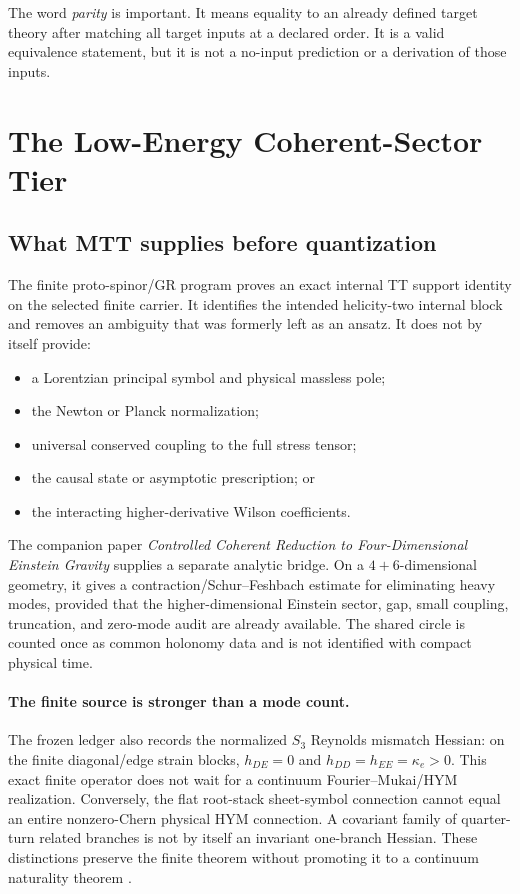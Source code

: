 \documentclass[11pt]{article}
\begin{document}
The word \emph{parity} is important. It means equality to an already defined
target theory after matching all target inputs at a declared order. It is a
valid equivalence statement, but it is not a no-input prediction or a
derivation of those inputs.

\section{The Low-Energy Coherent-Sector Tier}

\subsection{What MTT supplies before quantization}

The finite proto-spinor/GR program proves an exact internal TT support
identity on the selected finite carrier. It identifies the intended
helicity-two internal block and removes an ambiguity that was formerly left
as an ansatz. It does not by itself provide:
\begin{itemize}
\item a Lorentzian principal symbol and physical massless pole;
\item the Newton or Planck normalization;
\item universal conserved coupling to the full stress tensor;
\item the causal state or asymptotic prescription; or
\item the interacting higher-derivative Wilson coefficients.
\end{itemize}

The companion paper \emph{Controlled Coherent Reduction to Four-Dimensional
Einstein Gravity} supplies a separate analytic bridge. On a
\(4+6\)-dimensional geometry, it gives a contraction/Schur--Feshbach estimate
for eliminating heavy modes, provided that the higher-dimensional Einstein
sector, gap, small coupling, truncation, and zero-mode audit are already
available. The shared circle is counted once as common holonomy data and is
not identified with compact physical time.

\paragraph{The finite source is stronger than a mode count.}
The frozen ledger also records the normalized $S_3$ Reynolds mismatch
Hessian: on the finite diagonal/edge strain blocks,
$h_{DE}=0$ and $h_{DD}=h_{EE}=\kappa_e>0$. This exact finite operator
does not wait for a continuum Fourier--Mukai/HYM realization. Conversely,
the flat root-stack sheet-symbol connection cannot equal an entire
nonzero-Chern physical HYM connection. A covariant family of quarter-turn
related branches is not by itself an invariant one-branch Hessian.
These distinctions preserve the finite theorem without promoting it to a
continuum naturality theorem \cite{FrozenQGStatus}.
\end{document}
